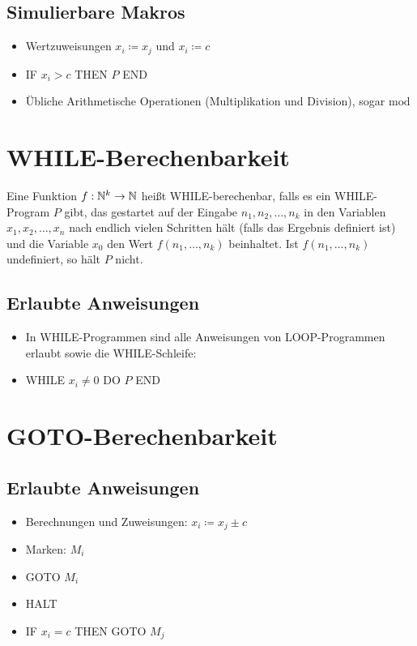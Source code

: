 \subsection{Simulierbare Makros}
\begin{itemize}
	\item Wertzuweisungen $x_i\coloneqq x_j$ und $x_i\coloneqq c$
	\item IF $x_i>c$ THEN $P$ END
	\item Übliche Arithmetische Operationen (Multiplikation und Division), sogar $\mathrm{mod}$
\end{itemize}

\section{WHILE-Berechenbarkeit}\label{sec:while}
Eine Funktion $f:\mathbb{N}^k\rightarrow \mathbb{N}$ heißt WHILE-berechenbar,  falls es ein WHILE-Program $P$ gibt, das gestartet auf der Eingabe $n_1,n_2,\ldots,n_k$ in den Variablen $x_1,x_2,\ldots,x_n$ nach endlich vielen Schritten hält (falls das Ergebnis definiert ist) und die Variable $x_0$ den Wert $f(n_1,\ldots,n_k)$ beinhaltet. Ist $f(n_1,\ldots,n_k)$ undefiniert, so hält $P$ nicht.
\subsection{Erlaubte Anweisungen}
\begin{itemize}
	\item In WHILE-Programmen sind alle Anweisungen von LOOP-Programmen erlaubt sowie die WHILE-Schleife:

	\item WHILE $x_i\neq 0$ DO $P$ END
\end{itemize}


\section{GOTO-Berechenbarkeit}\label{sec:goto}
\subsection{Erlaubte Anweisungen}
\begin{itemize}
	\item Berechnungen und Zuweisungen: $x_i\coloneqq x_j\pm c$
	\item Marken: $M_i$
	\item GOTO $M_i$
	\item HALT
	\item IF $x_i=c$ THEN GOTO $M_j$
\end{itemize}

